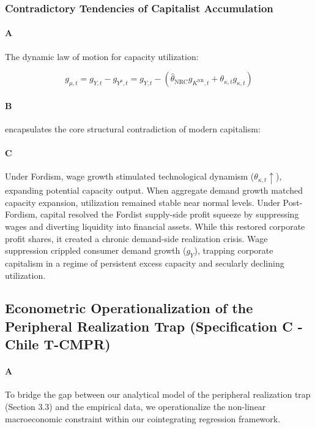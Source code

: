 \subsubsection{Contradictory Tendencies of Capitalist Accumulation}

\paragraph{A}
The dynamic law of motion for capacity utilization:

\[g_{\mu,t} = g_{Y,t} - g_{Y^p,t} = g_{Y,t} - (\hat{\theta}_{\text{NRC}} g_{K^{\text{NR}},t} + \theta_{\kappa,t} g_{\kappa,t})\]

\paragraph{B}
encapsulates the core structural contradiction of modern capitalism:

\paragraph{C}
Under Fordism, wage growth stimulated technological dynamism ($\theta_{\kappa,t} \uparrow$), expanding potential capacity output. When aggregate demand growth matched capacity expansion, utilization remained stable near normal levels. Under Post-Fordism, capital resolved the Fordist supply-side profit squeeze by suppressing wages and diverting liquidity into financial assets. While this restored corporate profit shares, it created a chronic demand-side realization crisis. Wage suppression crippled consumer demand growth ($g_Y$), trapping corporate capitalism in a regime of persistent excess capacity and secularly declining utilization.

\subsection{Econometric Operationalization of the Peripheral Realization Trap (Specification C - Chile T-CMPR)}

\paragraph{A}
To bridge the gap between our analytical model of the peripheral realization trap (Section 3.3) and the empirical data, we operationalize the non-linear macroeconomic constraint within our cointegrating regression framework.

